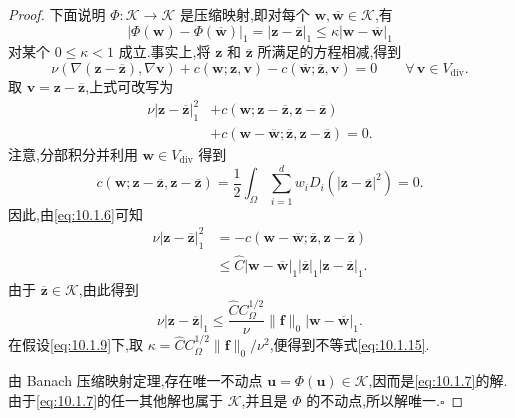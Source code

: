 \begin{proof}
下面说明 \(\Phi\colon\mathcal K\to\mathcal K\) 是压缩映射,即对每个 \(\boldsymbol{w},\overline{\boldsymbol{w}}\in\mathcal K\),有
\begin{equation}\label{eq:10.1.15}
  |\Phi(\boldsymbol{w})-\Phi(\overline{\boldsymbol{w}})|_1
     =|\boldsymbol{z}-\overline{\boldsymbol{z}}|_1
     \le\kappa|\boldsymbol{w}-\overline{\boldsymbol{w}}|_1
\end{equation}
对某个 \(0\le\kappa<1\) 成立.事实上,将 \(\boldsymbol{z}\) 和 \(\overline{\boldsymbol{z}}\) 所满足的方程相减,得到
\[
  \nu(\nabla(\boldsymbol{z}-\overline{\boldsymbol{z}}),\nabla\boldsymbol{v})
       +c(\boldsymbol{w};\boldsymbol{z},\boldsymbol{v})
       -c(\overline{\boldsymbol{w}};\overline{\boldsymbol{z}},\boldsymbol{v})=0
      \qquad\forall\,\boldsymbol{v}\in V_{\mathrm{div}} .
\]
取 \(\boldsymbol{v}=\boldsymbol{z}-\overline{\boldsymbol{z}}\),上式可改写为
\[
  \begin{aligned}
    \nu|\boldsymbol{z}-\overline{\boldsymbol{z}}|_1^2
       &+c(\boldsymbol{w};\boldsymbol{z}-\overline{\boldsymbol{z}},\boldsymbol{z}-\overline{\boldsymbol{z}})\\
       &+c(\boldsymbol{w}-\overline{\boldsymbol{w}};\overline{\boldsymbol{z}},\boldsymbol{z}-\overline{\boldsymbol{z}})
        =0 .
  \end{aligned}
\]
注意,分部积分并利用 \(\boldsymbol{w}\in V_{\mathrm{div}}\) 得到
\[
  c(\boldsymbol{w};\boldsymbol{z}-\overline{\boldsymbol{z}},\boldsymbol{z}-\overline{\boldsymbol{z}})
    =\frac12\int_\Omega\sum_{i=1}^d w_iD_i(|\boldsymbol{z}-\overline{\boldsymbol{z}}|^2)=0.
\]
因此,由\eqref{eq:10.1.6}可知
\[
  \begin{aligned}
    \nu|\boldsymbol{z}-\overline{\boldsymbol{z}}|_1^2
      &=-c(\boldsymbol{w}-\overline{\boldsymbol{w}};\overline{\boldsymbol{z}},\boldsymbol{z}-\overline{\boldsymbol{z}})\\
      &\le\widehat C|\boldsymbol{w}-\overline{\boldsymbol{w}}|_1
            |\overline{\boldsymbol{z}}|_1|\boldsymbol{z}-\overline{\boldsymbol{z}}|_1 .
  \end{aligned}
\]
由于 \(\overline{\boldsymbol{z}}\in\mathcal K\),由此得到
\[
  \nu|\boldsymbol{z}-\overline{\boldsymbol{z}}|_1
       \le\frac{\widehat C C_\Omega^{1/2}}{\nu}\|\boldsymbol{f}\|_0
            |\boldsymbol{w}-\overline{\boldsymbol{w}}|_1.
\]
在假设\eqref{eq:10.1.9}下,取 \(\kappa=\widehat C C_\Omega^{1/2}\|\boldsymbol{f}\|_0/\nu^2\),便得到不等式\eqref{eq:10.1.15}.

由 Banach 压缩映射定理,存在唯一不动点 \(\boldsymbol{u}=\Phi(\boldsymbol{u})\in\mathcal K\),因而是\eqref{eq:10.1.7}的解.由于\eqref{eq:10.1.7}的任一其他解也属于 \(\mathcal K\),并且是 \(\Phi\) 的不动点,所以解唯一.\hfill\(\square\)
\end{proof}

